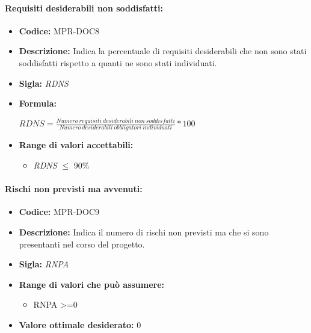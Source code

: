 \paragraph{Requisiti desiderabili non soddisfatti:}
\begin{itemize}
  \item \textbf{Codice:} MPR-DOC8
  \item \textbf{Descrizione:} Indica la percentuale di requisiti desiderabili che non sono stati  soddisfatti rispetto a quanti ne sono stati individuati.
  \item \textbf{Sigla:} \textit{RDNS}
  \item \textbf{Formula:}
  \begin{center}
    \(RDNS=\frac{Numero\ requisiti\ desiderabili\ non\ soddisfatti}{Numero\ desiderabili\  obbligatori\ individuati}*100\)
  \end{center}
  \item \textbf{Range di valori accettabili:}
  \begin{itemize}
      \item \textit{RDNS} $\leq$ 90\%
  
  \end{itemize}
\end{itemize}




\paragraph{Rischi non previsti ma avvenuti:}
\begin{itemize}
    \item \textbf{Codice:} MPR-DOC9
    \item \textbf{Descrizione:} Indica il numero di rischi non previsti ma che si sono presentanti nel corso del progetto.
    \item \textbf{Sigla:} \textit{RNPA}
    \item \textbf{Range di valori che può assumere:}
    \begin{itemize}
        \item  RNPA >=0
    \end{itemize}
    \item \textbf{Valore ottimale desiderato:} 0
    

    
\end{itemize}












